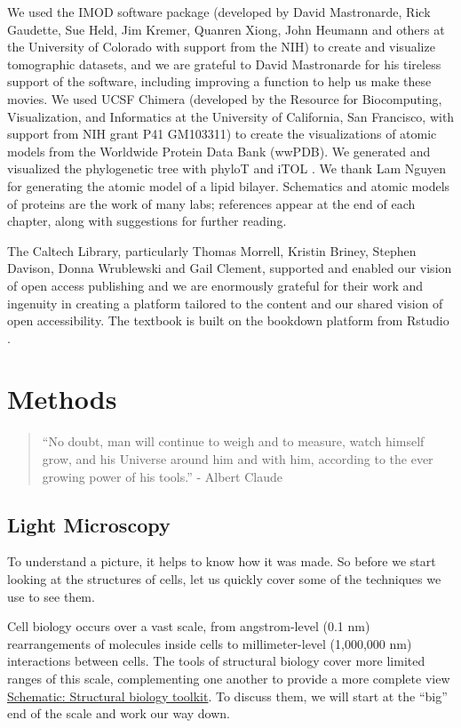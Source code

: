 \documentclass[]{tufte-book}
\begin{document}
We used the IMOD software package (developed by David Mastronarde, Rick Gaudette, Sue Held, Jim Kremer, Quanren Xiong, John Heumann and others at the University of Colorado with support from the NIH) to create and visualize tomographic datasets, and we are grateful to David Mastronarde for his tireless support of the software, including improving a function to help us make these movies. We used UCSF Chimera (developed by the Resource for Biocomputing, Visualization, and Informatics at the University of California, San Francisco, with support from NIH grant P41 GM103311) to create the visualizations of atomic models from the Worldwide Protein Data Bank (wwPDB). We generated and visualized the phylogenetic tree with phyloT and iTOL \citep{letunic2019}. We thank Lam Nguyen for generating the atomic model of a lipid bilayer. Schematics and atomic models of proteins are the work of many labs; references appear at the end of each chapter, along with suggestions for further reading.

The Caltech Library, particularly Thomas Morrell, Kristin Briney, Stephen Davison, Donna Wrublewski and Gail Clement, supported and enabled our vision of open access publishing and we are enormously grateful for their work and ingenuity in creating a platform tailored to the content and our shared vision of open accessibility. The textbook is built on the bookdown platform from Rstudio \citep{xie2016}.

\hypertarget{methods}{%
\chapter{Methods}\label{methods}}

\begin{quote}
``No doubt, man will continue to weigh and to measure, watch himself grow, and his Universe around him and with him, according to the ever growing power of his tools.''
- Albert Claude \citep{claude1974}
\end{quote}

\hypertarget{light-microscopy}{%
\section{Light Microscopy}\label{light-microscopy}}

To understand a picture, it helps to know how it was made. So before we start looking at the structures of cells, let us quickly cover some of the techniques we use to see them.

Cell biology occurs over a vast scale, from angstrom-level (0.1 nm) rearrangements of molecules inside cells to millimeter-level (1,000,000 nm) interactions between cells. The tools of structural biology cover more limited ranges of this scale, complementing one another to provide a more complete view \protect\hyperlink{Structural_biology_toolkit}{Schematic: Structural biology toolkit}. To discuss them, we will start at the ``big'' end of the scale and work our way down.
\end{document}
